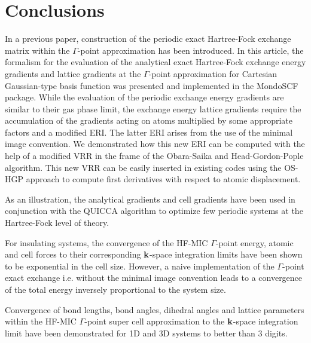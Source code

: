 \documentclass[prl,twocolumn,showpacs,twocolumngrid,superbib]{revtex4}
\begin{document}
\section{Conclusions}\label{Sec:Conclusions}

In a previous paper, construction of the periodic exact Hartree-Fock exchange 
matrix within the $\Gamma$-point approximation
has been introduced. In this article, the formalism for the evaluation of 
the analytical exact Hartree-Fock exchange energy gradients and lattice gradients at 
the $\Gamma$-point approximation for Cartesian Gaussian-type basis function 
was presented and implemented in the {\sc MondoSCF} package. 
While the evaluation of the periodic exchange energy gradients are similar to their 
gas phase limit, the exchange energy lattice gradients require the accumulation of 
the gradients acting on atoms multiplied by some appropriate factors and a 
modified ERI. The latter ERI arises from the use of the minimal image convention. 
We demonstrated how this new ERI can be computed with the help of a modified VRR 
in the frame of the Obara-Saika and Head-Gordon-Pople algorithm. This new VRR can
be easily inserted in existing codes using the OS-HGP approach to compute 
first derivatives with respect to atomic displacement. 

As an illustration, the analytical gradients and cell gradients have been used 
in conjunction with the QUICCA algorithm to optimize few periodic systems at 
the Hartree-Fock level of theory. 

For insulating systems, the convergence of the HF-MIC $\Gamma$-point energy, 
atomic and cell forces to their corresponding 
${\bf k}$-space integration limits have been shown to be exponential 
in the cell size. 
However, a naive implementation of the $\Gamma$-point exact exchange i.e. without
the minimal image convention leads to a convergence of the total energy 
inversely proportional to the system size.

Convergence of bond lengths, bond angles, 
dihedral angles and lattice parameters within the HF-MIC $\Gamma$-point
super cell approximation to the ${\bf k}$-space integration limit have
been demonstrated for 1D and 3D systems to better than 3 digits.
\end{document}
